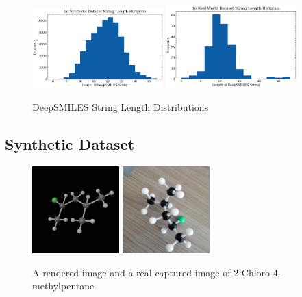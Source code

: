 \documentclass[12pt]{article}
\begin{document}
\begin{figure}
    \centering
    \includegraphics[width=0.45\textwidth]{sy_len.png}
    \includegraphics[width=0.45\textwidth]{real_len.png}
    \caption{DeepSMILES String Length Distributions}
    \label{fig:dis}
\end{figure}

\subsection{Synthetic Dataset}
\begin{figure}
    \centering
    \includegraphics[width=0.3\textwidth]{generated}
    \includegraphics[width=0.3\textwidth]{cap}
    \caption{A rendered image and a real captured image of 2-Chloro-4-methylpentane}
    \label{fig:example}
\end{figure}
\end{document}
